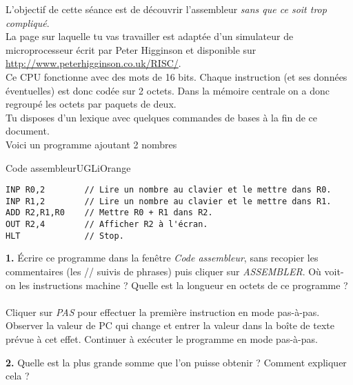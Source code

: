 \documentclass[a4paper,10pt,french]{article}
\begin{document}

L'objectif de cette séance est de découvrir l'assembleur \textit{sans que ce soit trop compliqué}.\\

La page sur laquelle tu vas travailler est adaptée d'un simulateur de microprocesseur écrit par Peter Higginson et disponible sur \url{http://www.peterhigginson.co.uk/RISC/}.\\

Ce CPU fonctionne avec des mots de 16 bits. Chaque instruction (et ses données éventuelles) est donc codée sur 2 octets. Dans la mémoire centrale on a donc regroupé les octets par paquets de deux.\\

Tu disposes d'un lexique avec quelques commandes de bases à la fin de ce document.\\

Voici un programme ajoutant 2 nombres
\begin{encadrecolore}{Code assembleur}{UGLiOrange}
\begin{verbatim}
INP R0,2        // Lire un nombre au clavier et le mettre dans R0.
INP R1,2        // Lire un nombre au clavier et le mettre dans R1.
ADD R2,R1,R0    // Mettre R0 + R1 dans R2.
OUT R2,4        // Afficher R2 à l'écran.
HLT             // Stop.
\end{verbatim}
\end{encadrecolore}



\textbf{1.}	\'Ecrire ce programme dans la fenêtre \textit{Code assembleur}, sans recopier les commentaires (les // suivis de phrases) puis cliquer sur \textit{ASSEMBLER}. Où voit-on les instructions machine ? Quelle est la longueur en octets de ce programme ?\\

\\

Cliquer sur \textit{PAS} pour effectuer la première instruction en mode pas-à-pas. Observer la valeur de PC qui change et entrer la valeur dans la boîte de texte prévue à cet effet.
Continuer à exécuter le programme en mode pas-à-pas.

\textbf{2.} Quelle est la plus grande somme que l'on puisse obtenir ? Comment
expliquer cela ?\\

\\
\end{document}
